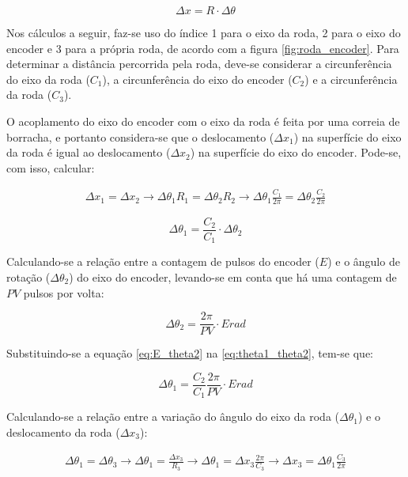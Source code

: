 \begin{equation}
  \Delta x = R \cdot \Delta \theta
  \label{eq:deslocamento_circunferencia}
\end{equation}

Nos cálculos a seguir, faz-se uso do índice 1 para o eixo da roda, 2 para o eixo do encoder e 3 para a própria roda, de acordo com a figura \ref{fig:roda_encoder}. Para determinar a distância percorrida pela roda, deve-se considerar a circunferência do eixo da roda ($C_1$), a circunferência do eixo do encoder ($C_2$) e a circunferência da roda ($C_3$).

O acoplamento do eixo do encoder com o eixo da roda é feita por uma correia de borracha, e portanto considera-se que o deslocamento ($ \Delta x_1$) na superfície do eixo da roda é igual ao deslocamento ($ \Delta x_2$) na superfície do eixo do encoder. Pode-se, com isso, calcular:

\begin{eqnarray*}
   \Delta x_1 =  \Delta x_2 \rightarrow \Delta \theta_1 R_1 = \Delta \theta_2 R_2 \rightarrow \Delta \theta_1 \frac{C_1}{2 \pi} = \Delta \theta_2 \frac{C_2}{2 \pi} 
\end{eqnarray*}

\begin{equation}
  \Delta \theta_1 = \frac{C_2}{C_1} \cdot \Delta \theta_2
  \label{eq:theta1_theta2}
\end{equation}

Calculando-se a relação entre a contagem de pulsos do encoder ($E$) e o ângulo de rotação ($\Delta \theta_2$) do eixo do encoder, levando-se em conta que há uma contagem de $PV$ pulsos por volta:

\begin{equation}
  \Delta \theta_2 = \frac{2 \pi}{PV} \cdot E \unit{rad}
  \label{eq:E_theta2}
\end{equation}

Substituindo-se a equação \ref{eq:E_theta2} na \ref{eq:theta1_theta2}, tem-se que:

\begin{equation}
  \Delta \theta_1 = \frac{C_2}{C_1} \frac{2 \pi}{PV} \cdot E \unit{rad}
  \label{eq:theta_1}
\end{equation}

Calculando-se a relação entre a variação do ângulo do eixo da roda ($\Delta \theta_1$) e o deslocamento da roda ($\Delta x_3$):

\begin{eqnarray*}
  \Delta \theta_1 = \Delta \theta_3 \rightarrow \Delta \theta_1 =  \frac{\Delta x_3}{R_3} \rightarrow \Delta \theta_1 = \Delta x_3 \frac{2 \pi}{C_3} \rightarrow  \Delta x_3 = \Delta \theta_1 \frac{C_3}{2 \pi}
\end{eqnarray*}

